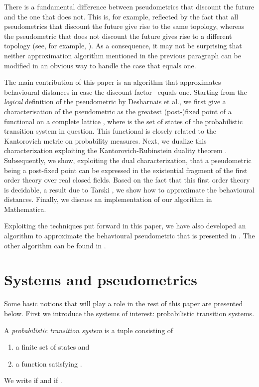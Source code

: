 \documentclass{LMCS}
\begin{document}
There is a fundamental difference between pseudometrics that discount the
future and the one that does not.  This is, for example, reflected by the
fact that all pseudometrics that discount the future give rise to the same
topology, whereas the pseudometric that does not discount the future gives
rise to a different topology (see, for example, \cite[page~350]{DGJP04:tcs}).  
As a consequence,
it may not be surprising that neither approximation algorithm mentioned
in the previous paragraph can be modified in an obvious way to handle the
case that  equals one.

The main contribution of this paper is an algorithm that approximates 
behavioural distances in case the discount factor~ equals one. 
Starting from the \emph{logical} definition of the pseudometric by 
Desharnais et al., we first give a characterisation of the pseudometric 
as the greatest (post-)fixed point of a functional on a complete lattice 
, where  is the set of states of the probabilistic 
transition system in question.  This functional is closely related to the 
Kantorovich metric \cite{K42:dan} on probability measures.  Next, we dualize 
this characterization exploiting the Kantorovich-Rubinstein
duality theorem \cite{KR58:vestni}.  Subsequently, we show, exploiting
the dual characterization, that a pseudometric being a post-fixed
point can be expressed in the existential fragment of the first order
theory over real closed fields.  Based on the fact that this
first order theory is decidable, a result due to Tarski \cite{T51},
we show how to approximate the behavioural distances. 
Finally, we discuss an implementation of our algorithm in
Mathematica.

Exploiting the techniques put forward in this paper, we have also
developed an algorithm to approximate the behavioural pseudometric that
is presented in \cite{B05:concur}.  The other algorithm 
can be found in \cite{S06:york}.

\section{Systems and pseudometrics}

Some basic notions that will play a role in the rest of this paper are
presented below.  First we introduce the systems of interest:
probabilistic transition systems.

\begin{defi}
A {\sl probabilistic transition system\/} is a tuple  
consisting of
\begin{enumerate}[]
\item
a finite set  of states and
\item
a function  satisfying
.
\end{enumerate}
We write  if  and
 if .
\end{defi}
\end{document}
